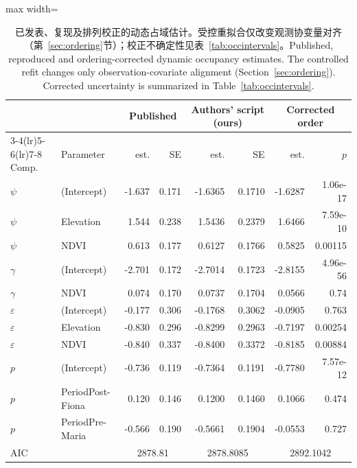 \begin{table}[htbp]\centering\small
\caption{\ifzh 已发表、复现及排列校正的动态占域估计。受控重拟合仅改变观测协变量对齐（第~\ref{sec:ordering}节）；校正不确定性见表~\ref{tab:occintervals}。\else Published, reproduced and ordering-corrected dynamic occupancy estimates. The controlled refit changes only observation-covariate alignment (Section~\ref{sec:ordering}). Corrected uncertainty is summarized in Table~\ref{tab:occintervals}.\fi}\label{tab:occ}
\begin{adjustbox}{max width=\linewidth}
\begin{tabular}{llrrrrrr}\toprule
& & \multicolumn{2}{c}{Published} & \multicolumn{2}{c}{Authors' script (ours)} & \multicolumn{2}{c}{Corrected order} \\ \cmidrule(lr){3-4}\cmidrule(lr){5-6}\cmidrule(lr){7-8}
Comp. & Parameter & est. & SE & est. & SE & est. & $p$ \\ \midrule
$\psi$ & (Intercept) & -1.637 & 0.171 & -1.6365 & 0.1710 & -1.6287 & 1.06e-17 \\
$\psi$ & Elevation & 1.544 & 0.238 & 1.5436 & 0.2379 & 1.6466 & 7.59e-10 \\
$\psi$ & NDVI & 0.613 & 0.177 & 0.6127 & 0.1766 & 0.5825 & 0.00115 \\
$\gamma$ & (Intercept) & -2.701 & 0.172 & -2.7014 & 0.1723 & -2.8155 & 4.96e-56 \\
$\gamma$ & NDVI & 0.074 & 0.170 & 0.0737 & 0.1704 & 0.0566 & 0.74 \\
$\varepsilon$ & (Intercept) & -0.177 & 0.306 & -0.1768 & 0.3062 & -0.0905 & 0.763 \\
$\varepsilon$ & Elevation & -0.830 & 0.296 & -0.8299 & 0.2963 & -0.7197 & 0.00254 \\
$\varepsilon$ & NDVI & -0.840 & 0.337 & -0.8400 & 0.3372 & -0.8185 & 0.00884 \\
$p$ & (Intercept) & -0.736 & 0.119 & -0.7364 & 0.1191 & -0.7780 & 7.57e-12 \\
$p$ & PeriodPost-Fiona & 0.120 & 0.146 & 0.1200 & 0.1460 & 0.1066 & 0.474 \\
$p$ & PeriodPre-Maria & -0.566 & 0.190 & -0.5661 & 0.1904 & -0.0553 & 0.727 \\
\midrule
\multicolumn{2}{l}{AIC} & \multicolumn{2}{c}{2878.81} & \multicolumn{2}{c}{2878.8085} & \multicolumn{2}{c}{2892.1042} \\
\bottomrule\end{tabular}
\end{adjustbox}
\end{table}